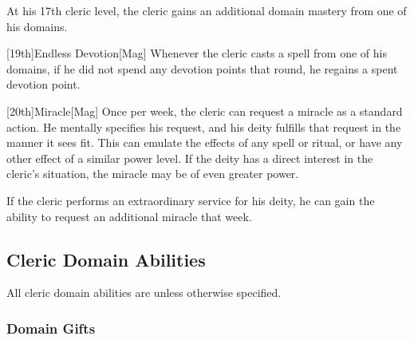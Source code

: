         At his 17th cleric level, the cleric gains an additional domain mastery from one of his domains.

        [19th]{Endless Devotion}[Mag]
        Whenever the cleric casts a spell from one of his domains, if he did not spend any devotion points that round, he regains a spent devotion point.

        [20th]{Miracle}[Mag]
        Once per week, the cleric can request a miracle as a standard action.
        He mentally specifies his request, and his deity fulfills that request in the manner it sees fit.
        This can emulate the effects of any spell or ritual, or have any other effect of a similar power level.
        If the deity has a direct interest in the cleric's situation, the miracle may be of even greater power.

        If the cleric performs an extraordinary service for his deity, he can gain the ability to request an additional miracle that week.

    \subsection{Cleric Domain Abilities}
        All cleric domain abilities are  unless otherwise specified.

        \subsubsection{Domain Gifts}\label{Domain Gifts}

